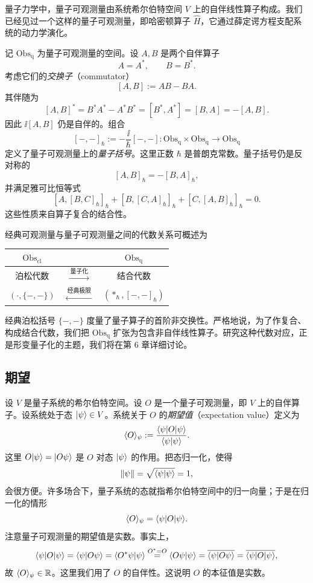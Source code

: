 量子力学中，量子可观测量由系统希尔伯特空间 $V$ 上的自伴线性算子构成。我们已经见过一个这样的量子可观测量，即哈密顿算子 $\hat H$，它通过薛定谔方程支配系统的动力学演化。

记 $\mathrm{Obs}_{\mathrm{q}}$ 为量子可观测量的空间。设 $A,B$ 是两个自伴算子
\[
A=A^*,\qquad B=B^*.
\]
考虑它们的\emph{交换子}（commutator）
\[
[A,B]:=AB-BA.
\]
其伴随为
\[
[A,B]^*=B^*A^*-A^*B^*=[B^*,A^*]=[B,A]=-[A,B].
\]
因此 $\ii[A,B]$ 仍是自伴的。组合
\[
[-,-]_{\hbar}:=-\frac{\ii}{\hbar}[-,-]:\mathrm{Obs}_{\mathrm{q}}\times\mathrm{Obs}_{\mathrm{q}}\longrightarrow\mathrm{Obs}_{\mathrm{q}}
\]
定义了量子可观测量上的\emph{量子括号}。这里正数 $\hbar$ 是普朗克常数。量子括号仍是反对称的
\[
[A,B]_{\hbar}=-[B,A]_{\hbar},
\]
并满足雅可比恒等式
\[
[A,[B,C]_{\hbar}]_{\hbar}+[B,[C,A]_{\hbar}]_{\hbar}+[C,[A,B]_{\hbar}]_{\hbar}=0.
\]
这些性质来自算子复合的结合性。

经典可观测量与量子可观测量之间的代数关系可概述为

\begin{center}
\begin{tabular}{ccc}
\toprule
$\mathrm{Obs}_{\mathrm{cl}}$ & & $\mathrm{Obs}_{\mathrm{q}}$\\
\midrule
泊松代数 & $\xrightarrow{\ \text{量子化}\ }$ & 结合代数\\
$(\cdot,\{-,-\})$ & $\xleftarrow{\ \text{经典极限}\ }$ & $(*_{\hbar},[-,-]_{\hbar})$\\
\bottomrule
\end{tabular}
\end{center}

经典泊松括号 $\{-,-\}$ 度量了量子算子的首阶非交换性。严格地说，为了作复合、构成结合代数，我们把 $\mathrm{Obs}_{\mathrm{q}}$ 扩张为包含非自伴线性算子。研究这种代数对应，正是形变量子化的主题，我们将在第 6 章详细讨论。

\subsection{期望}

设 $V$ 是量子系统的希尔伯特空间。设 $O$ 是一个量子可观测量，即 $V$ 上的自伴算子。设系统处于态 $|\psi\rangle\in V$。系统关于 $O$ 的\emph{期望值}（expectation value）定义为
\[
\langle O\rangle_{\psi}:=\frac{\langle \psi|O|\psi\rangle}{\langle \psi|\psi\rangle}.
\]
这里 $O|\psi\rangle=|O\psi\rangle$ 是 $O$ 对态 $|\psi\rangle$ 的作用。把态归一化，使得
\[
\lVert \psi\rVert=\sqrt{\langle \psi|\psi\rangle}=1,
\]
会很方便。许多场合下，量子系统的态就指希尔伯特空间中的归一向量；于是在归一化的情形
\[
\langle O\rangle_{\psi}=\langle \psi|O|\psi\rangle.
\]
注意量子可观测量的期望值是实数。事实上，
\[
\langle \psi|O|\psi\rangle=\langle \psi|O\psi\rangle
=\langle O^*\psi|\psi\rangle
\overset{O^*=O}{=}\langle O\psi|\psi\rangle
=\overline{\langle \psi|O\psi\rangle}
=\overline{\langle \psi|O|\psi\rangle},
\]
故 $\langle O\rangle_{\psi}\in\mathbb{R}$。这里我们用了 $O$ 的自伴性。这说明 $O$ 的本征值是实数。

